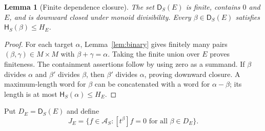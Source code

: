 \documentclass[11pt,a4paper]{article}
\newtheorem{lemma}[theorem]{Lemma}
\theoremstyle{definition}
\theoremstyle{remark}
\newcommand{\AS}{\mathscr A_S}
\newcommand{\depth}{\mathsf H}
\newcommand{\Div}{\mathsf D}
\newcommand{\coef}[1]{\left[#1\right]}
\begin{document}
\begin{lemma}[Finite dependence closure]\label{lem:divisors}
The set $\Div_S(E)$ is finite, contains $0$ and $E$, and is downward closed
under monoid divisibility. Every $\beta\in\Div_S(E)$ satisfies
$\depth_S(\beta)\le H_E$.
\end{lemma}
\begin{proof}
For each target $\alpha$, Lemma~\ref{lem:binary} gives finitely many pairs
$(\beta,\gamma)\in M\times M$ with $\beta+\gamma=\alpha$.
Taking the finite union over $E$ proves finiteness. The containment
assertions follow by using zero as a summand. If $\beta$ divides $\alpha$
and $\beta'$ divides $\beta$, then $\beta'$ divides $\alpha$, proving
downward closure. A maximum-length word for $\beta$ can be concatenated
with a word for $\alpha-\beta$; its length is at most
$\depth_S(\alpha)\le H_E$.
\end{proof}

Put $D_E=\Div_S(E)$ and define
\begin{equation}\label{eq:JE}
 J_E=\{f\in\AS:\coef{t^\beta}f=0\text{ for all }\beta\in D_E\}.
\end{equation}
\end{document}

